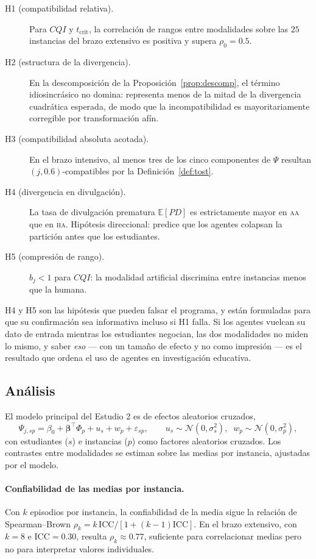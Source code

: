 \documentclass[11pt,a4paper]{article}
\theoremstyle{definition}
\theoremstyle{plain}
\theoremstyle{remark}
\newcommand{\Esp}{\mathbb{E}}
\newcommand{\modAA}{\textsc{aa}}
\newcommand{\modHA}{\textsc{ha}}
\begin{document}
\begin{description}
\item[H1 (compatibilidad relativa).] Para $CQI$ y $t_{\mathrm{crit}}$, la
  correlación de rangos entre modalidades sobre las $25$ instancias del brazo
  extensivo es positiva y supera $\rho_0=0.5$.
\item[H2 (estructura de la divergencia).] En la descomposición de la
  Proposición~\ref{prop:descomp}, el término idiosincrásico no domina: representa
  menos de la mitad de la divergencia cuadrática esperada, de modo que la
  incompatibilidad es mayoritariamente corregible por transformación afín.
\item[H3 (compatibilidad absoluta acotada).] En el brazo intensivo, al menos tres
  de los cinco componentes de $\Psi$ resultan $(j,0.6)$-compatibles por la
  Definición~\ref{def:tost}.
\item[H4 (divergencia en divulgación).] La tasa de divulgación prematura
  $\Esp[PD]$ es estrictamente mayor en \modAA{} que en \modHA{}. Hipótesis
  direccional: predice que los agentes colapsan la partición antes que los
  estudiantes.
\item[H5 (compresión de rango).] $b_j<1$ para $CQI$: la modalidad artificial
  discrimina entre instancias menos que la humana.
\end{description}

H4 y H5 son las hipótesis que pueden falsar el programa, y están formuladas para
que su confirmación sea informativa incluso si H1 falla. Si los agentes vuelcan su
dato de entrada mientras los estudiantes negocian, las dos modalidades no miden lo
mismo, y saber \emph{eso} --- con un tamaño de efecto y no como impresión --- es el
resultado que ordena el uso de agentes en investigación educativa.

\subsection{Análisis}

El modelo principal del Estudio 2 es de efectos aleatorios cruzados,
\[
  \Psi_{j,sp}=\beta_{0}+\boldsymbol{\beta}^{\!\top}\Phi_p+u_s+w_p+\varepsilon_{sp},
  \qquad u_s\sim\mathcal{N}(0,\sigma_s^{2}),\;\; w_p\sim\mathcal{N}(0,\sigma_p^{2}),
\]
con estudiantes ($s$) e instancias ($p$) como factores aleatorios cruzados. Los
contrastes entre modalidades se estiman sobre las medias por instancia, ajustadas
por el modelo.

\paragraph{Confiabilidad de las medias por instancia.} Con $k$ episodios por
instancia, la confiabilidad de la media sigue la relación de Spearman--Brown
$\rho_k=k\,\mathrm{ICC}/[1+(k-1)\mathrm{ICC}]$. En el brazo extensivo, con
$k=8$ e $\mathrm{ICC}=0.30$, resulta $\rho_k\approx0.77$, suficiente para
correlacionar medias pero no para interpretar valores individuales.
\end{document}

